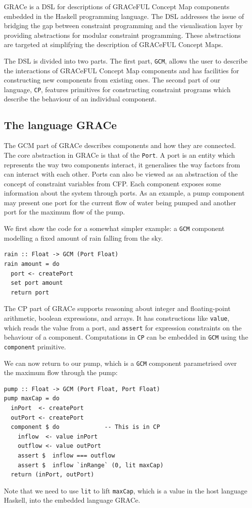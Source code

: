 GRACe is a DSL for
descriptions of GRACeFUL Concept Map components embedded in the
Haskell programming language.
%
The DSL addresses the issue of bridging the gap between constraint
programming and the visualisation layer by providing abstractions for
modular constraint programming.
%
These abstractions are targeted at simplifying the description of
GRACeFUL Concept Maps.

The DSL is divided into two parts.
%
The first part, \texttt{GCM}, allows the user to describe the
interactions of GRACeFUL Concept Map components and has facilities for
constructing new components from existing ones.
%
The second part of our language, \texttt{CP}, features primitives for constructing
constraint programs which describe the behaviour of an individual
component.

\subsection{The language GRACe}

The GCM part of GRACe describes components and how they are connected.
%
The core abstraction in GRACe is that of the \texttt{Port}.
%
A port is an entity which represents the way two components interact,
it generalises the way factors from \cite{D4.1} can interact with each
other.
%
Ports can also be viewed as an abstraction of the concept of constraint
variables from CFP.
%
Each component exposes some information about the system through
ports.
%
As an example, a pump component may present one port for the current
flow of water being pumped and another port for the maximum flow of
the pump.

We first show the code for a somewhat simpler example: a \texttt{GCM}
component modelling a fixed amount of rain falling from the sky.
\begin{verbatim}
rain :: Float -> GCM (Port Float)
rain amount = do
  port <- createPort
  set port amount
  return port
\end{verbatim}

The CP part of GRACe supports reasoning about integer and
floating-point arithmetic, boolean expressions, and arrays.
%
It has constructions like \texttt{value}, which reads the value from a
port, and \texttt{assert} for expression constraints on the behaviour
of a component.
%
Computations in \texttt{CP} can be embedded in \texttt{GCM} using the
\texttt{component} primitive.

We can now return to our pump, which is a \texttt{GCM} component
parametrised over the maximum flow through the pump:
%
\begin{verbatim}
pump :: Float -> GCM (Port Float, Port Float)
pump maxCap = do
  inPort  <- createPort
  outPort <- createPort
  component $ do             -- This is in CP
    inflow  <- value inPort
    outflow <- value outPort
    assert $  inflow === outflow
    assert $  inflow `inRange` (0, lit maxCap)
  return (inPort, outPort)
\end{verbatim}
%
Note that we need to use \texttt{lit} to lift \texttt{maxCap}, which
is a value in the host language Haskell, into the embedded language
GRACe.

